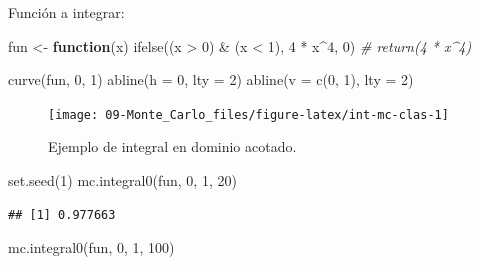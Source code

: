 \documentclass[
]{book}
\newenvironment{Shaded}{\begin{snugshade}}{\end{snugshade}}
\newcommand{\AttributeTok}[1]{\textcolor[rgb]{0.77,0.63,0.00}{#1}}
\newcommand{\CommentTok}[1]{\textcolor[rgb]{0.56,0.35,0.01}{\textit{#1}}}
\newcommand{\ControlFlowTok}[1]{\textcolor[rgb]{0.13,0.29,0.53}{\textbf{#1}}}
\newcommand{\DecValTok}[1]{\textcolor[rgb]{0.00,0.00,0.81}{#1}}
\newcommand{\FunctionTok}[1]{\textcolor[rgb]{0.00,0.00,0.00}{#1}}
\newcommand{\NormalTok}[1]{#1}
\newcommand{\OtherTok}[1]{\textcolor[rgb]{0.56,0.35,0.01}{#1}}
\newcommand{\SpecialCharTok}[1]{\textcolor[rgb]{0.00,0.00,0.00}{#1}}
\theoremstyle{break}
\theoremstyle{definition}
\theoremstyle{definition}
\theoremstyle{definition}
\theoremstyle{definition}
\theoremstyle{remark}
\begin{document}
Función a integrar:

\begin{Shaded}
\begin{Highlighting}[]
\NormalTok{fun }\OtherTok{\textless{}{-}} \ControlFlowTok{function}\NormalTok{(x) }\FunctionTok{ifelse}\NormalTok{((x }\SpecialCharTok{\textgreater{}} \DecValTok{0}\NormalTok{) }\SpecialCharTok{\&}\NormalTok{ (x }\SpecialCharTok{\textless{}} \DecValTok{1}\NormalTok{), }\DecValTok{4} \SpecialCharTok{*}\NormalTok{ x}\SpecialCharTok{\^{}}\DecValTok{4}\NormalTok{, }\DecValTok{0}\NormalTok{)}
\CommentTok{\# return(4 * x\^{}4)}

\FunctionTok{curve}\NormalTok{(fun, }\DecValTok{0}\NormalTok{, }\DecValTok{1}\NormalTok{)}
\FunctionTok{abline}\NormalTok{(}\AttributeTok{h =} \DecValTok{0}\NormalTok{, }\AttributeTok{lty =} \DecValTok{2}\NormalTok{)}
\FunctionTok{abline}\NormalTok{(}\AttributeTok{v =} \FunctionTok{c}\NormalTok{(}\DecValTok{0}\NormalTok{, }\DecValTok{1}\NormalTok{), }\AttributeTok{lty =} \DecValTok{2}\NormalTok{)}
\end{Highlighting}
\end{Shaded}

\begin{figure}[!htb]

{\centering \texttt{[image: 09-Monte\_Carlo\_files/figure-latex/int-mc-clas-1]} 

}

\caption{Ejemplo de integral en dominio acotado.}\label{fig:int-mc-clas}
\end{figure}

\begin{Shaded}
\begin{Highlighting}[]
\FunctionTok{set.seed}\NormalTok{(}\DecValTok{1}\NormalTok{)}
\FunctionTok{mc.integral0}\NormalTok{(fun, }\DecValTok{0}\NormalTok{, }\DecValTok{1}\NormalTok{, }\DecValTok{20}\NormalTok{)}
\end{Highlighting}
\end{Shaded}

\begin{verbatim}
## [1] 0.977663
\end{verbatim}

\begin{Shaded}
\begin{Highlighting}[]
\FunctionTok{mc.integral0}\NormalTok{(fun, }\DecValTok{0}\NormalTok{, }\DecValTok{1}\NormalTok{, }\DecValTok{100}\NormalTok{)}
\end{Highlighting}
\end{Shaded}
\end{document}

